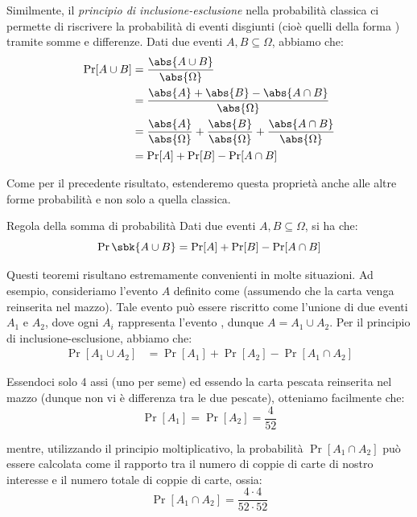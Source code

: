 \documentclass[a4paper, 12pt]{report}
\begin{document}
    Similmente, il \textit{principio di inclusione-esclusione} nella probabilità classica ci permette di riscrivere la probabilità di eventi disgiunti (cioè quelli della forma ) tramite somme e differenze. Dati due eventi $A, B  \subseteq \Omega$, abbiamo che:
    \[\begin{split}
        \Pr[A \cup B] &= \frac{\abs{A \cup B}}{\abs{\Omega}} \\
        &= \frac{\abs{A} + \abs{B} - \abs{A \cap B}}{\abs{\Omega}} \\
        &= \frac{\abs{A}}{\abs{\Omega}} + \frac{\abs{B}}{\abs{\Omega}} + \frac{\abs{A \cap B}}{\abs{\Omega}} \\
        &= \Pr[A] + \Pr[B] - \Pr[A \cap B]
    \end{split}\]

    Come per il precedente risultato, estenderemo questa proprietà anche alle altre forme probabilità e non solo a quella classica.

    \begin{framedthm}{Regola della somma di probabilità}
        Dati due eventi $A,B \subseteq \Omega$, si ha che:
        \[\Pr\sbk{A \cup B} = \Pr[A] + \Pr[B] - \Pr[A \cap B]\]
    \end{framedthm}

    Questi teoremi risultano estremamente convenienti in molte situazioni. Ad esempio, consideriamo l'evento $A$ definito come  (assumendo che la carta venga reinserita nel mazzo). Tale evento può essere riscritto come l'unione di due eventi $A_1$ e $A_2$, dove ogni $A_i$ rappresenta l'evento , dunque $A = A_1 \cup A_2$. Per il principio di inclusione-esclusione, abbiamo che:
    \[\begin{split}
        \Pr[A_1 \cup A_2] &= \Pr[A_1] + \Pr[A_2] - \Pr[A_1 \cap A_2]
    \end{split}\]

    Essendoci solo 4 assi (uno per seme) ed essendo la carta pescata reinserita nel mazzo (dunque non vi è differenza tra le due pescate), otteniamo facilmente che:
    \[\Pr[A_1] = \Pr[A_2] = \frac{4}{52}\]

    mentre, utilizzando il principio moltiplicativo, la probabilità $\Pr[A_1 \cap A_2]$ può essere calcolata come il rapporto tra il numero di coppie di carte di nostro interesse e il numero totale di coppie di carte, ossia:
    \[\Pr[A_1 \cap A_2] = \frac{4 \cdot 4}{52 \cdot 52}\]
\end{document}
